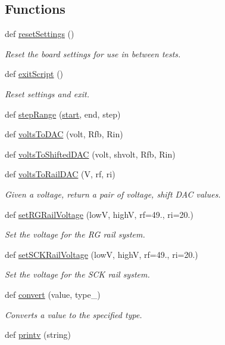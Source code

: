 \subsection*{Functions}
\begin{DoxyCompactItemize}
\item 
def \hyperlink{namespace_w_r_e_b_test_a6e2b3326b0377d9631605fe89e91c890}{reset\+Settings} ()
\begin{DoxyCompactList}\small\item\em Reset the board settings for use in between tests. \end{DoxyCompactList}\item 
def \hyperlink{namespace_w_r_e_b_test_abc7cd7c86faa6126711ebd4b5242f794}{exit\+Script} ()
\begin{DoxyCompactList}\small\item\em Reset settings and exit. \end{DoxyCompactList}\item 
def \hyperlink{namespace_w_r_e_b_test_adbfa8ad5a4a0a82ff1d41cce4e52b1c2}{step\+Range} (\hyperlink{namespace_w_r_e_b_test_a10204c9815e05b0ec10333b96a9f23b1}{start}, end, step)
\item 
def \hyperlink{namespace_w_r_e_b_test_a41336a62ef3706e77de2da37e7a61b80}{volts\+To\+D\+AC} (volt, Rfb, Rin)
\item 
def \hyperlink{namespace_w_r_e_b_test_a89da8741c281e720d74c25973130f9a3}{volts\+To\+Shifted\+D\+AC} (volt, shvolt, Rfb, Rin)
\item 
def \hyperlink{namespace_w_r_e_b_test_a0806fdf61e3889ec1967d3c834800adb}{volts\+To\+Rail\+D\+AC} (V, rf, ri)
\begin{DoxyCompactList}\small\item\em Given a voltage, return a pair of voltage, shift D\+AC values. \end{DoxyCompactList}\item 
def \hyperlink{namespace_w_r_e_b_test_a16558115ec6d6bb08bf67247f28ea9d7}{set\+R\+G\+Rail\+Voltage} (lowV, highV, rf=49., ri=20.)
\begin{DoxyCompactList}\small\item\em Set the voltage for the RG rail system. \end{DoxyCompactList}\item 
def \hyperlink{namespace_w_r_e_b_test_ab4c15fe1ef1c32c678920f13389d0392}{set\+S\+C\+K\+Rail\+Voltage} (lowV, highV, rf=49., ri=20.)
\begin{DoxyCompactList}\small\item\em Set the voltage for the S\+CK rail system. \end{DoxyCompactList}\item 
def \hyperlink{namespace_w_r_e_b_test_ad2a0aa10dfce2ada829ac903539e5075}{convert} (value, type\+\_\+)
\begin{DoxyCompactList}\small\item\em Converts a value to the specified type. \end{DoxyCompactList}\item 
def \hyperlink{namespace_w_r_e_b_test_a49d73de2edbd5f06016c586eeaea0280}{printv} (string)
\end{DoxyCompactItemize}
